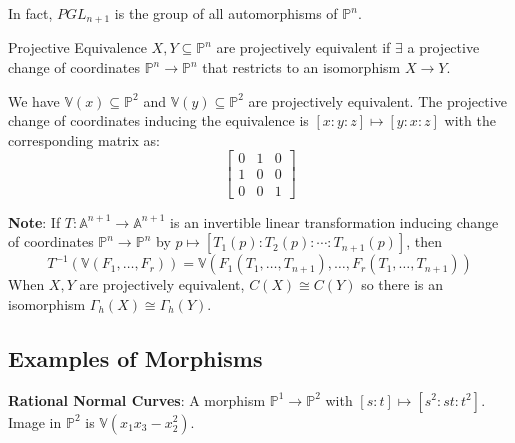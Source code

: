 \documentclass{report}
\begin{document}
In fact, $PGL_{n + 1}$ is the group of all automorphisms of $\mathbb{P}^{n}$.

\begin{definition}{Projective Equivalence}
    $X, Y \subseteq \mathbb{P}^{n}$ are projectively equivalent if $\exists$ a projective change of coordinates $\mathbb{P}^{n} \rightarrow \mathbb{P}^{n}$ that restricts to an isomorphism $X \rightarrow Y$.  
\end{definition}

\begin{examples}
    \begin{example}
        We have $\mathbb{V}(x) \subseteq \mathbb{P}^{2}$ and $\mathbb{V}(y) \subseteq \mathbb{P}^{2}$ are projectively equivalent. The projective change of coordinates inducing the equivalence is $[x : y : z] \mapsto [y : x : z]$ with the corresponding matrix as:
            \begin{equation*}
                \begin{bmatrix}
                    0 & 1 & 0 \\
                    1 & 0 & 0 \\
                    0 & 0 & 1   
                \end{bmatrix}
            \end{equation*}
    \end{example}
\end{examples}

\textbf{Note}: If $T : \mathbb{A}^{n + 1} \rightarrow \mathbb{A}^{n + 1}$ is an invertible linear transformation inducing change of coordinates $\mathbb{P}^{n} \rightarrow \mathbb{P}^{n}$ by $p \mapsto [T_{1}(p) : T_{2}(p) : \cdots : T_{n + 1}(p)]$, then 
    \begin{equation*}
        T^{-1}(\mathbb{V}(F_{1}, \ldots, F_{r})) = \mathbb{V}(F_{1}(T_{1}, \ldots, T_{n + 1}), \ldots, F_{r}(T_{1}, \ldots, T_{n + 1}))
    \end{equation*}
When $X, Y$ are projectively equivalent, $C(X) \cong C(Y)$ so there is an isomorphism $\Gamma_{h}(X) \cong \Gamma_{h}(Y)$.

\begin{topic}
    \section{Examples of Morphisms}
\end{topic}

\textbf{Rational Normal Curves}: A morphism $\mathbb{P}^{1} \rightarrow \mathbb{P}^{2}$ with $[s : t] \mapsto [s^{2} : st : t^{2}]$. Image in $\mathbb{P}^{2}$ is $\mathbb{V}(x_{1}x_{3} - x_{2}^{2})$. 
\end{document}
